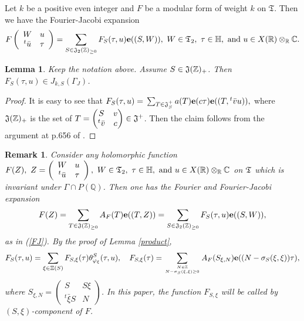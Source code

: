 \documentclass[11pt]{amsart}
\numberwithin{equation}{section}
\newtheorem{remark}[theorem]{Remark}
\newtheorem{lemma}[theorem]{Lemma}
\theoremstyle{definition}
\begin{document}
Let $k$ be a positive even integer and $F$ be a modular form of weight $k$ on $\mathfrak{T}$. 
Then we have the Fourier-Jacobi expansion 
\begin{equation}\label{FJ}
F\left(\begin{array}{cc}
W & u \\
{}^t\bar{u} & \tau 
\end{array}\right)=\sum_{S\in  \frak J_2({\mathbb{Z}})_{\ge 0}} F_S(\tau,u)\bold{e}((S,W)),\ W\in \frak T_2,\ \tau\in\mathbb{H},\ 
{\rm and}\ u\in X({\mathbb{R}})\otimes_{\mathbb{R}}{\mathbb{C}}.
\end{equation}
\begin{lemma}\label{FJC} Keep the notation above. Assume $S\in \frak J({\mathbb{Z}})_+$. 
Then $F_S(\tau,u)\in J_{k,S}(\Gamma_J)$. 
\end{lemma}
\begin{proof}
It is easy to see that $F_S(\tau,u)={\displaystyle}\sum_{T\in \frak J_S^+} a(T) \bold{e}(c\tau) \bold{e}((T, {}^t \bar v u)),$
where $\frak J({\mathbb{Z}})_+$ is the set of $T=\begin{pmatrix} S&v\\ {}^t \bar v&c\end{pmatrix}\in \frak J^+$. 
Then the claim follows from the argument at p.656 of \cite{Ik1}. 
\end{proof}

\begin{remark}\label{important-rmk}
Consider any holomorphic function $F(Z),\ Z=\left(\begin{array}{cc}
W & u \\
{}^t\bar{u} & \tau 
\end{array}\right),\ W\in \frak T_2,\ \tau\in\mathbb{H},\ 
{\rm and}\ u\in X({\mathbb{R}})\otimes_{\mathbb{R}}{\mathbb{C}}$ on $\frak T$ which is invariant under ${\Gamma}\cap P({\mathbb{Q}})$. 
Then one has 
the Fourier and Fourier-Jacobi expansion 
$$F(Z)=\sum_{T\in  \frak J({\mathbb{Z}})_{\ge 0}}A_F(T)\bold{e}((T,Z))=\sum_{S\in  \frak J_2({\mathbb{Z}})_{\ge 0}}F_S(\tau,u)\bold{e}((S,W)),
$$ 
as in (\ref{FJ}). 
By the proof of Lemma \ref{product}, 
$$F_S(\tau,u)=\sum_{\xi\in \Xi(S)}F_{S,\xi}(\tau) \theta^S_{\varphi_\xi}(\tau,u),\quad 
F_{S,\xi}(\tau)=\sum_{N\in {\mathbb{Z}} \atop N-\sigma_S(\xi,\xi)\ge 0}A_F(S_{\xi,N})\bold{e}((N-\sigma_S(\xi,\xi))\tau),
$$
where $S_{\xi,N}=\left(\begin{array}{cc}
S & S\xi \\
{}^t\bar{\xi}S & N 
\end{array}\right)$. In this paper, the function $F_{S,\xi}$ will be called by $(S,\xi)$-component of $F$. 
\end{remark}
\end{document}
